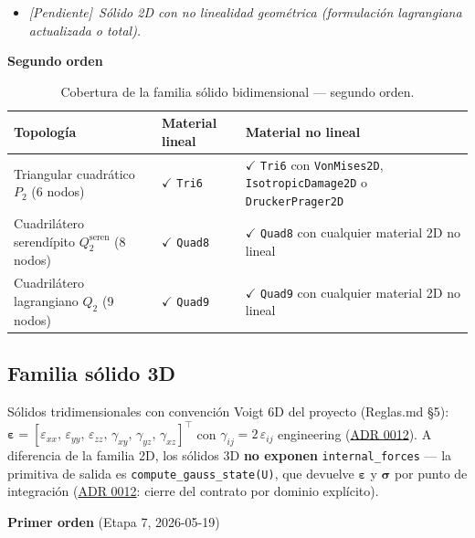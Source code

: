\documentclass[11pt,oneside]{report}
\newcommand{\pendiente}[1]{\textcolor{pendienteorange}{\textit{[Pendiente]}~\textcolor{pendienteorange}{\textit{#1}}}}
\begin{document}
\begin{itemize}
  \item \pendiente{Sólido 2D con no linealidad geométrica (formulación lagrangiana actualizada o total).}
\end{itemize}

\textbf{Segundo orden}

\begin{table}[h]
\centering
\caption{Cobertura de la familia sólido bidimensional --- segundo orden.}
\begin{tabularx}{\textwidth}{YYY}
\hline
\textbf{Topología} & \textbf{Material lineal} & \textbf{Material no lineal} \\
\hline
Triangular cuadrático $P_2$ (6 nodos) & \ensuremath{\checkmark} \texttt{Tri6} & \ensuremath{\checkmark} \texttt{Tri6} con \texttt{VonMises2D}, \texttt{IsotropicDamage2D} o \texttt{DruckerPrager2D} \\
Cuadrilátero serendípito $Q_2^{\text{seren}}$ (8 nodos) & \ensuremath{\checkmark} \texttt{Quad8} & \ensuremath{\checkmark} \texttt{Quad8} con cualquier material 2D no lineal \\
Cuadrilátero lagrangiano $Q_2$ (9 nodos) & \ensuremath{\checkmark} \texttt{Quad9} & \ensuremath{\checkmark} \texttt{Quad9} con cualquier material 2D no lineal \\
\hline
\end{tabularx}
\end{table}
\subsection{Familia sólido 3D}

Sólidos tridimensionales con convención Voigt 6D del proyecto (Reglas.md §5):
$\boldsymbol\varepsilon = [\varepsilon_{xx},\, \varepsilon_{yy},\, \varepsilon_{zz},\, \gamma_{xy},\, \gamma_{yz},\, \gamma_{xz}]^\top$
con $\gamma_{ij} = 2\,\varepsilon_{ij}$ engineering (\hyperref[adr:0012]{ADR 0012}). A diferencia de la familia 2D, los sólidos 3D \textbf{no exponen} \texttt{internal\_forces} --- la primitiva de salida es \texttt{compute\_\allowbreak{}gauss\_\allowbreak{}state(U)}, que devuelve $\boldsymbol\varepsilon$ y $\boldsymbol\sigma$ por punto de integración (\hyperref[adr:0012]{ADR 0012}: cierre del contrato por dominio explícito).

\textbf{Primer orden} (Etapa 7, 2026-05-19)
\end{document}
